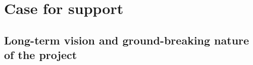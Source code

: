 








\chapter{Case for support}\label{part1}

\section{Long-term vision and ground-breaking nature of the project}

